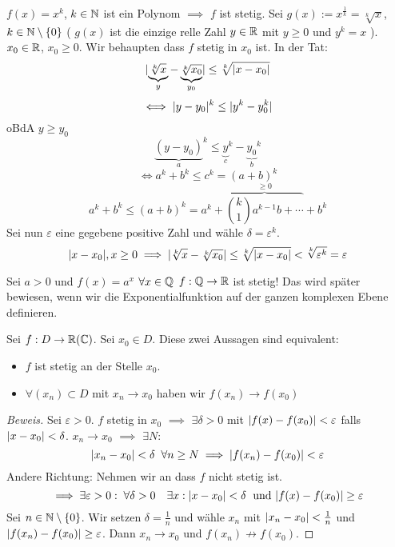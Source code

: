 \begin{Bsp}
  $f(x)=x^k$, $k\in\mathbb{N}$ ist ein Polynom $\implies$ $f$ ist stetig. 
Sei $g(x):=x^\frac{1}{k}=\sqrt[k]{x}$, 
$k\in\mathbb{N}\setminus\left\{ 0 \right\}$ ( $g(x)$ ist die einzige relle Zahl $y\in\mathbb{R}$ mit $y\geq 0$ und $y^k=x$ ). 
$x_0\in\mathbb{R}$, $x_0\geq 0$. Wir behaupten dass $f$ stetig in $x_0$ ist.
In der Tat:
  \[\mathopen| \underbrace{\sqrt[k]{x}}_y-\underbrace{\sqrt[k]{x_0}}_{y_0} \mathclose| \leq \sqrt[k]{\mathopen| x-x_0 \mathclose|}\]
  \[\iff \mathopen| y-y_0 \mathclose|^k\leq\mathopen| y^k-y_0^k \mathclose|\]
  oBdA $y\geq y_0$
  \[{\underbrace{\left( y-y_0 \right)}_a}^k\leq {\underbrace{y}_c}^k-
{\underbrace{y_0}_b}^k\]
  \[\iff a^k+b^k\leq c^k=(a+b)^k\]
  \[a^k+b^k\leq (a+b)^k=a^k+\overbrace{\binom{k}{1}a^{k-1}b+\cdots}^{\geq 0}+b^k\]
  Sei nun $\varepsilon$ eine gegebene positive Zahl
und w\"ahle $\delta=\varepsilon^{k}$. 
\[\mathopen| x-x_0 \mathclose|, x\geq 0 \implies
\mathopen| \sqrt[k]{x}-\sqrt[k]{x_0} \mathclose|\leq\sqrt[k]{\mathopen| x-x_0 \mathclose|}
< \sqrt[k]{\varepsilon^k}=\varepsilon\]
\end{Bsp}
\begin{Bsp}
  Sei $a>0$ und $f(x)=a^x$ $\forall x\in\mathbb{Q}$ $f:\mathbb{Q}\to\mathbb{R}$ ist stetig!
Das wird sp\"ater bewiesen, wenn wir die Exponentialfunktion auf
der ganzen komplexen Ebene definieren.
\end{Bsp}
\begin{Sat}
  Sei $f:D\to\mathbb{R}(\mathbb{C})$. Sei $x_0\in D$. Diese zwei Aussagen sind equivalent:
  \begin{itemize}
    \item $f$ ist stetig an der Stelle $x_0$.
    \item $\forall(x_n)\subset D$ mit $x_n\to x_0$ haben wir $f(x_n)\to f(x_0)$
  \end{itemize}
\end{Sat}
\begin{proof}[Beweis]
  Sei $\varepsilon >0$. $f$ stetig in $x_0$ $\implies$ $\exists\delta>0$ mit $\mathopen| f(x)-f(x_0) \mathclose|<\varepsilon$ falls $\mathopen| x-x_0 \mathclose|<\delta$. $x_n\to x_0$ $\implies$ $\exists N$:
  \[\mathopen| x_n-x_0 \mathclose|<\delta\;\;\forall n\geq N\implies \mathopen| f(x_n)-f(x_0) \mathclose|<\varepsilon\]
  Andere Richtung: Nehmen wir an dass $f$ nicht stetig ist.
  \[\implies \exists \varepsilon>0:\; \forall \delta>0 
\quad \exists x: \mathopen| x-x_0 \mathclose|<\delta\;\mbox{ und }\mathopen| f(x)-f(x_0) \mathclose|\geq \varepsilon\]
Sei $n\in \mathbb{N}\setminus \{0\}$. Wir setzen $\delta=\frac{1}{n}$ und w\"ahle
$x_n$ mit $\mathopen| x_n-x_0 \mathclose|<\frac{1}{n}$ und 
$\mathopen| f(x_n)-f(x_0) \mathclose|\geq \varepsilon$. Dann $x_n\to x_0$ und $f(x_n)\not\to f(x_0)$.
\end{proof}

